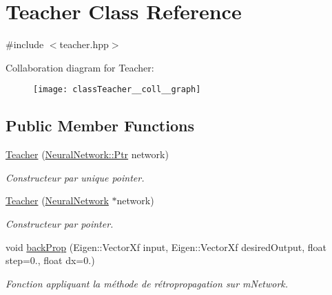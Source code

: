 \hypertarget{classTeacher}{}\section{Teacher Class Reference}
\label{classTeacher}


{\ttfamily \#include $<$teacher.\+hpp$>$}



Collaboration diagram for Teacher\+:
\nopagebreak
\begin{figure}[H]
\begin{center}
\leavevmode
\texttt{[image: classTeacher\_\_coll\_\_graph]}
\end{center}
\end{figure}
\subsection*{Public Member Functions}
\begin{DoxyCompactItemize}
\item 
\hyperlink{classTeacher_a8ca95fc7a29e082a676d420b9fd8fd67}{Teacher} (\hyperlink{classNeuralNetwork_a31de381df65f261fd0f38e0559995d1a}{Neural\+Network\+::\+Ptr} network)
\begin{DoxyCompactList}\small\item\em Constructeur par unique pointer. \end{DoxyCompactList}\item 
\hyperlink{classTeacher_afd32ab70242f2c5886d030a5e7d05919}{Teacher} (\hyperlink{classNeuralNetwork}{Neural\+Network} $\ast$network)
\begin{DoxyCompactList}\small\item\em Constructeur par pointer. \end{DoxyCompactList}\item 
void \hyperlink{classTeacher_a99fc69c5319be890394d2c8503e217c8}{back\+Prop} (Eigen\+::\+Vector\+Xf input, Eigen\+::\+Vector\+Xf desired\+Output, float step=0., float dx=0.)
\begin{DoxyCompactList}\small\item\em Fonction appliquant la méthode de rétropropagation sur m\+Network. \end{DoxyCompactList}\end{DoxyCompactItemize}
